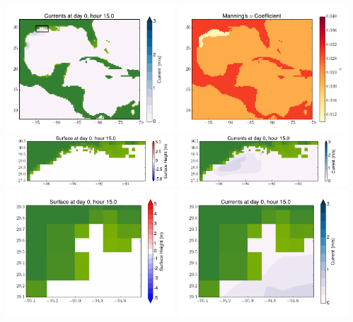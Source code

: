 \documentclass[11pt]{article}
\begin{document}
\includegraphics[width=0.475\textwidth]{frame0087fig2.png}
\vskip 10pt 
\includegraphics[width=0.475\textwidth]{frame0087fig3.png}
\includegraphics[width=0.475\textwidth]{frame0087fig4.png}
\vskip 10pt 
\includegraphics[width=0.475\textwidth]{frame0087fig5.png}
\includegraphics[width=0.475\textwidth]{frame0087fig6.png}
\vskip 10pt 
\includegraphics[width=0.475\textwidth]{frame0087fig7.png}
\end{document}
